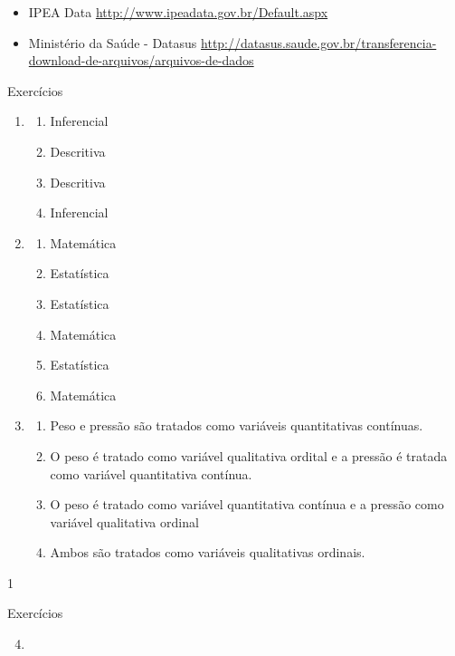 {\begin{itemize}
\item {} 
IPEA Data \textendash{} \url{http://www.ipeadata.gov.br/Default.aspx}

\item {} 
Ministério da Saúde - Datasus \textendash{} \url{http://datasus.saude.gov.br/transferencia-download-de-arquivos/arquivos-de-dados}

\end{itemize}
\clearpage

\exercise
\begin{answer}{Exercícios}
{\exerciselist
  \begin{enumerate}
  \item 
  \begin{enumerate}
  \item Inferencial
  \item Descritiva
  \item Descritiva
  \item Inferencial
  \end{enumerate}
  \item
  \begin{enumerate}
  \item Matemática
  \item Estatística
  \item Estatística
  \item Matemática
  \item Estatística
  \item Matemática
  \end{enumerate}
  \item 
  \begin{enumerate}
  \item Peso e pressão são tratados como variáveis quantitativas contínuas.
  \item O peso é tratado como variável qualitativa ordital e a pressão é tratada como variável quantitativa contínua.
  \item O peso é tratado como variável quantitativa contínua e a pressão como variável qualitativa ordinal
  \item Ambos são tratados como variáveis qualitativas ordinais.
  \end{enumerate}
  \end{enumerate}
}{1}
\end{answer}
\clearmargin
\begin{answer}{Exercícios}
{\exerciselist
  \begin{enumerate}\setcounter{enumi}{3}
  \item 

\end{enumerate}}
\end{answer}}
